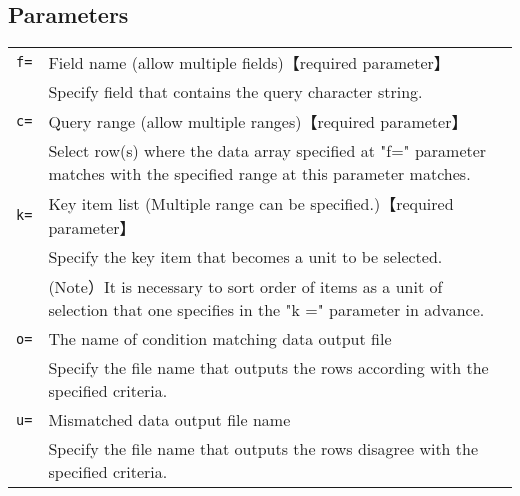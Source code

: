 \documentclass[a4paper]{jarticle}
\begin{document}
\subsection*{Parameters}
\begin{table}[htbp]
{\small
\begin{tabular}{ll}
\verb|f=|    & Field name (allow multiple fields)【required parameter】\\
& Specify field that contains the query character string. \\
\verb|c=|    & Query range (allow multiple ranges)【required parameter】 \\
& Select row(s) where the data array specified at "f=" parameter matches with the specified range at this parameter matches. \\
\verb|k=|    & Key item list (Multiple range can be specified.)【required parameter】 \\
& Specify the key item that becomes a unit to be selected.\\
& (Note）It is necessary to sort order of items as a unit of selection that one specifies in the "k =" parameter in advance.\\
\verb|o=|    & The name of condition matching data output file \\
& Specify the file name that outputs the rows according with the specified criteria. \\
\verb|u=|    &Mismatched data output file name \\
& Specify the file name that outputs the rows disagree with the specified criteria.\\
\end{tabular} 
}
\end{table} 
\end{document}
